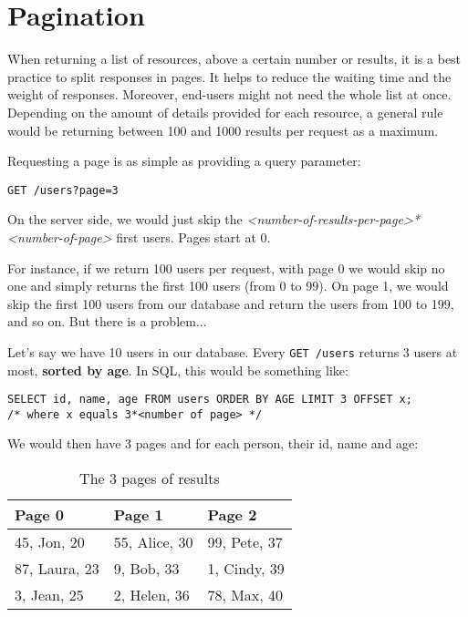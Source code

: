 \section{Pagination}

When returning a list of resources, above a certain number or results, it is a best practice to split responses in pages. It helps to reduce the waiting time and the weight of responses. Moreover, end-users might not need the whole list at once. Depending on the amount of details provided for each resource, a general rule would be returning between 100 and 1000 results per request as a maximum.

\medskip

Requesting a page is as simple as providing a query parameter:

\begin{lstlisting}
GET /users?page=3
\end{lstlisting}

On the server side, we would just skip the \textit{<number-of-results-per-page>*<number-of-page>} first users. Pages start at 0.

\medskip

For instance, if we return 100 users per request, with page 0 we would skip no one and simply returns the first 100 users (from 0 to 99). On page 1, we would skip the first 100 users from our database and return the users from 100 to 199, and so on. But there is a problem...

\bigskip

Let's say we have 10 users in our database. Every \lstinline{GET /users} returns 3 users at most, \textbf{sorted by age}. In SQL, this would be something like:

\sql
\begin{lstlisting}
SELECT id, name, age FROM users ORDER BY AGE LIMIT 3 OFFSET x;
/* where x equals 3*<number of page> */
\end{lstlisting}
\code{} %
We would then have 3 pages and for each person, their id, name and age:

\begin{table}[!h]
  \begin{center}
    \begin{tabular}{ | l  | l | l | }
      \hline
      Page 0 & Page 1 & Page 2\\
      \hline
      45, Jon, 20   & 55, Alice, 30 & 99, Pete, 37\\
      87, Laura, 23 & 9, Bob, 33    & 1, Cindy, 39\\
      3, Jean, 25   & 2, Helen, 36  & 78, Max, 40\\
      \hline
    \end{tabular}
  \end{center}
  \caption[Example of 3 pages of result after API calls]{The 3 pages of results}
\end{table}

